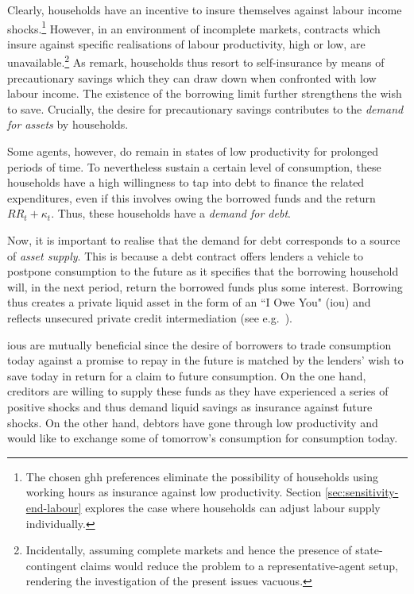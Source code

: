 \documentclass[a4paper,12pt]{article} %
\numberwithin{equation}{section} %
\numberwithin{figure}{section}
\numberwithin{table}{section}
\begin{document}
Clearly, households have an incentive to insure themselves against labour income shocks.\footnote{The chosen \Gls{ghh} preferences eliminate the possibility of households using working hours as insurance against low productivity. Section \ref{sec:sensitivity-end-labour} explores the case where households can adjust labour supply individually.} However, in an environment of incomplete markets, contracts which insure against specific realisations of labour productivity, high or low, are unavailable.\footnote{Incidentally, assuming complete markets and hence the presence of state-contingent claims would reduce the problem to a representative-agent setup, rendering the investigation of the present issues vacuous.} As \textcite{heath2009} remark, households thus resort to self-insurance by means of precautionary savings which they can draw down when confronted with low labour income. The existence of the borrowing limit further strengthens the wish to save. Crucially, the desire for precautionary savings contributes to the \textit{demand for assets} by households. 

Some agents, however, do remain in states of low productivity for prolonged periods of time. To nevertheless sustain a certain level of consumption, these households have a high willingness to tap into debt to finance the related expenditures, even if this involves owing the borrowed funds and the return $RR_t + \kappa_t$. Thus, these households have a \textit{demand for debt}.

Now, it is important to realise that the demand for debt corresponds to a source of \textit{asset supply}. This is because a debt contract offers lenders a vehicle to postpone consumption to the future as it specifies that the borrowing household will, in the next period, return the borrowed funds plus some interest. Borrowing thus creates a private liquid asset in the form of an ``I Owe You" (\Gls{iou}) and reflects unsecured private credit intermediation (see e.g.~\cite{bayer2023}).

\Gls{iou}s are mutually beneficial since the desire of borrowers to trade consumption today against a promise to repay in the future is matched by the lenders' wish to save today in return for a claim to future consumption. On the one hand, creditors are willing to supply these funds as they have experienced a series of positive shocks and thus demand liquid savings as insurance against future shocks. On the other hand, debtors have gone through low productivity and would like to exchange some of tomorrow's consumption for consumption today.
\end{document}
